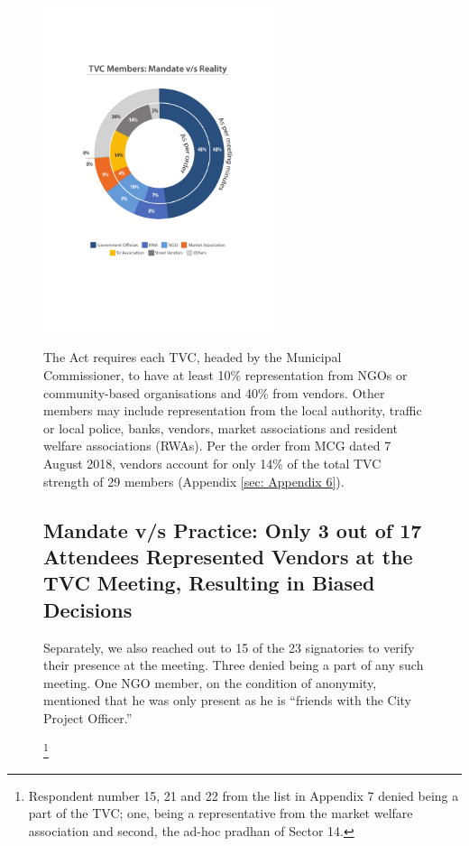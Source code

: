 \documentclass[a4paper, 12pt, twoside]{article}
\begin{document}
\begin{figure}
\centering
\includegraphics[width=0.6\textwidth]{mandatevsreality.pdf}

The Act requires each TVC, headed by the Municipal Commissioner, to have at least 10\% representation from NGOs or community-based organisations and 40\% from vendors. Other members may include representation from the local authority, traffic or local police, banks, vendors, market associations and resident welfare associations (RWAs). Per the order from MCG dated 7 August 2018, vendors account for only 14\% of the total TVC strength of 29 members (Appendix \ref{sec: Appendix 6}).


\subsection*{Mandate v/s Practice: Only 3 out of 17 Attendees Represented Vendors at the TVC Meeting, Resulting in Biased Decisions}


Separately, we also reached out to 15 of the 23 signatories to verify their presence at the meeting. Three denied being a part of any such meeting. One NGO member, on the condition of anonymity, mentioned that he was only present as he is “friends with the City Project Officer.”{\footnote{Respondent number 15, 21 and 22 from the list in Appendix 7 denied being a part of the TVC; one, being a representative from the market welfare association and second, the ad-hoc pradhan of Sector 14.}

}
\end{figure}
\end{document}
